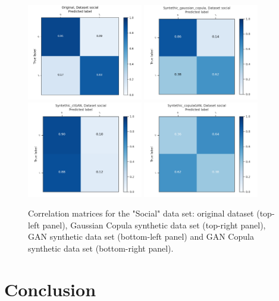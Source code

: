 \documentclass{article}
\begin{document}
\begin{figure}[h!]
	\centering
	\includegraphics[width=0.45\textwidth]{../ConfusionMatrixes/social_Original_.png}
	\includegraphics[width=0.45\textwidth]{../ConfusionMatrixes/social_Syntethic_gaussian_copula_.png}
	\includegraphics[width=0.45\textwidth]{../ConfusionMatrixes/social_Syntethic_ctGAN_.png}
	\includegraphics[width=0.45\textwidth]{../ConfusionMatrixes/social_Syntethic_copulaGAN_.png}
	
	\caption{Correlation matrices for the "Social" data set: original dataset (top-left panel), Gaussian Copula synthetic data set (top-right panel), GAN synthetic data set (bottom-left panel) and GAN Copula synthetic data set (bottom-right panel).  }
	\label{confusion_social}
\end{figure}





\section{Conclusion}

\clearpage
{}

\end{document}
